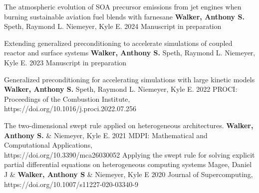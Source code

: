 \documentclass[lighthipster]{simplehipstercv}
\begin{document}
\begin{paracol}{2}
\publication
{The atmospheric evolution of SOA precursor emissions from jet engines when burning sustainable aviation fuel blends with farnesane}
{\textbf{Walker, Anthony S.} Speth, Raymond L. Niemeyer, Kyle E.}
{2024}
{Manuscript in preparation}
{}

\publication
{Extending generalized preconditioning to accelerate simulations of coupled reactor and surface systems}
{\textbf{Walker, Anthony S.} Speth, Raymond L. Niemeyer, Kyle E.}
{2023}
{Manuscript in preparation}
{}

\publication
{Generalized preconditioning for accelerating simulations with large kinetic models}
{\textbf{Walker, Anthony S.} Speth, Raymond L. Niemeyer, Kyle E.}
{2022}
{PROCI: Proceedings of the Combustion Institute,\\https://doi.org/10.1016/j.proci.2022.07.256}
{}

\publication
{The two-dimensional swept rule applied on heterogeneous architectures.} %
{\textbf{Walker, Anthony S.} \& Niemeyer,  Kyle E.} %
{2021} %
{MDPI: Mathematical and Computational Applications,\\ https://doi.org/10.3390/mca26030052} %
{} %
\publication
{Applying the swept rule for solving explicit partial differential equations on heterogeneous computing systems} %
{Magee, Daniel J \& \textbf{Walker, Anthony S} \& Niemeyer, Kyle E} %
{2020} %
{Journal of Supercomputing,\\ https://doi.org/10.1007/s11227-020-03340-9} %
{\color{black}} %








\end{paracol}
\end{document}
